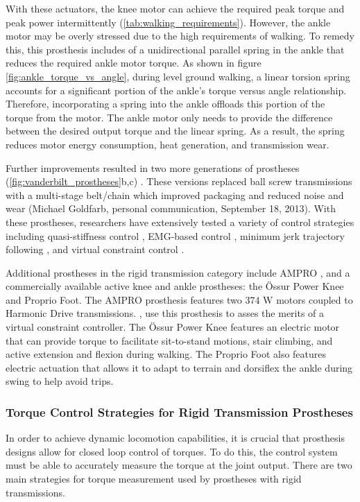 With these actuators, the knee motor can achieve the required peak torque and
peak power intermittently (\cref{tab:walking_requirements}). However, the ankle
motor may be overly stressed due to the high requirements of walking. To remedy
this, this prosthesis includes of a unidirectional parallel spring in the ankle
that reduces the required ankle motor torque. As shown in figure
\cref{fig:ankle_torque_vs_angle}, during level ground walking, a linear torsion
spring accounts for a significant portion of the ankle's torque versus angle
relationship. Therefore, incorporating a spring into the ankle offloads this
portion of the torque from the motor. The ankle motor only needs to provide the
difference between the desired output torque and the linear spring. As a result,
the spring reduces motor energy consumption, heat generation, and transmission
wear.

Further improvements resulted in two more generations of prostheses
(\cref{fig:vanderbilt_prostheses}b,c) \citep{lawson2013control,
lawson2014robotic}. These versions replaced ball screw transmissions with a
multi-stage belt/chain which improved packaging and reduced noise and wear
(Michael Goldfarb, personal communication, September 18, 2013).  With these
prostheses, researchers have extensively tested a variety of control strategies
including quasi-stiffness control \citep{sup2009preliminary, sup2011upslope,
lawson2013control, lawson2014robotic, lenzi2014speed}, EMG-based control
\citep{ha2011volitional, varol2010multiclass}, minimum jerk trajectory following
\citep{lenzi2014minimum}, and virtual constraint control
\citep{gregg2014virtual}. 

Additional prostheses in the rigid transmission category include AMPRO
\citep{zhao2016first}, and a commercially available active knee and ankle
prostheses: the Össur Power Knee and Proprio Foot. The AMPRO prosthesis features
two 374 W motors coupled to Harmonic Drive transmissions.
\citet{zhao2016first}, use this prosthesis to asses the merits of a virtual
constraint controller. The Össur Power Knee features an electric motor that can
provide torque to facilitate sit-to-stand motions, stair climbing, and active
extension and flexion during walking. The Proprio Foot also features electric
actuation that allows it to adapt to terrain and dorsiflex the ankle during
swing to help avoid trips. 

\subsubsection{Torque Control Strategies for Rigid Transmission Prostheses}
In order to achieve dynamic locomotion capabilities, it is crucial that
prosthesis designs allow for closed loop control of torques. To do this, the
control system must be able to accurately measure the torque at the joint
output. There are two main strategies for torque measurement used by prostheses
with rigid transmissions.

